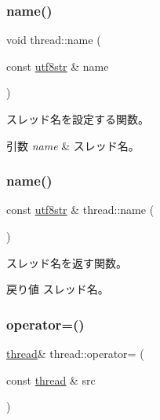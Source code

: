 \subsubsection{\texorpdfstring{name()}{name()}\hspace{0.1cm}{\footnotesize\ttfamily [1/2]}}
{\footnotesize\ttfamily void thread\+::name (\begin{DoxyParamCaption}\item[{const \hyperlink{classutf8str}{utf8str} \&}]{name }\end{DoxyParamCaption})}

スレッド名を設定する関数。 
\begin{DoxyParams}{引数}
{\em name} & スレッド名。 \\
\hline
\end{DoxyParams}
\hypertarget{classthread_a7e52f57766d1d11b6dbda15955c4a8ad}{}\label{classthread_a7e52f57766d1d11b6dbda15955c4a8ad} 
\subsubsection{\texorpdfstring{name()}{name()}\hspace{0.1cm}{\footnotesize\ttfamily [2/2]}}
{\footnotesize\ttfamily const \hyperlink{classutf8str}{utf8str} \& thread\+::name (\begin{DoxyParamCaption}{ }\end{DoxyParamCaption})}

スレッド名を返す関数。 \begin{DoxyReturn}{戻り値}
スレッド名。 
\end{DoxyReturn}
\hypertarget{classthread_a4d7ef0a71785e85bbed76e1a983e41c0}{}\label{classthread_a4d7ef0a71785e85bbed76e1a983e41c0} 
\subsubsection{\texorpdfstring{operator=()}{operator=()}\hspace{0.1cm}{\footnotesize\ttfamily [1/2]}}
{\footnotesize\ttfamily \hyperlink{classthread}{thread}\& thread\+::operator= (\begin{DoxyParamCaption}\item[{const \hyperlink{classthread}{thread} \&}]{src }\end{DoxyParamCaption})\hspace{0.3cm}{\ttfamily [delete]}}

